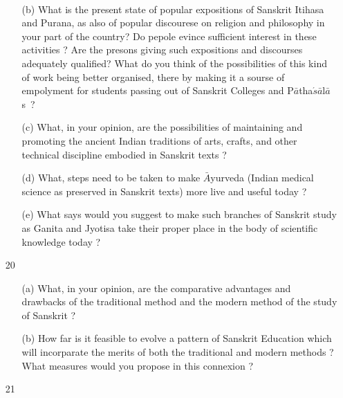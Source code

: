{\rm 
\begin{itemize} 
\item[~] \begin{itemize}
\item[(b)] What is the present state of popular expositions of Sanskrit Itihasa and Purana, as also of popular discourese on religion and philosophy in your part of the country? Do pepole evince sufficient interest in these activities ? Are the presons giving such expositions and discourses adequately qualified?  What do you think of the possibilities of this kind of work  being better organised, there by making it a sourse of empolyment for students passing out of Sanskrit Colleges and P$\bar{a}$tha$\acute{s}\bar{a}$l$\bar{a}$s~?
             
             \item[(c)] What, in your opinion, are the possibilities of maintaining and promoting the ancient Indian traditions of arts, crafts, and other technical discipline embodied in Sanskrit texts ?
             
            \item[(d)] What, steps need to be taken to make  $\bar{A}$yurveda (Indian medical science as preserved in Sanskrit texts) more live and useful today ?
            
            \item[(e)] What says would you suggest to make such branches of Sanskrit study as Ganita and Jyotisa take their proper place in the body of scientific knowledge today ?
            \end{itemize}
  
 \item[20] \begin{itemize}
             \item[(a)] What, in your opinion, are the comparative advantages and drawbacks of the traditional method and the modern method of the study of Sanskrit ?
             
             \item[(b)] How far is it feasible to evolve a pattern of Sanskrit Education which will incorparate the merits of both the traditional and modern methods ? What measures would you propose in this connexion ?
             
            \end{itemize}                      
  
 \item[21] \begin{itemize}
           

\end{itemize}
\end{itemize}}
